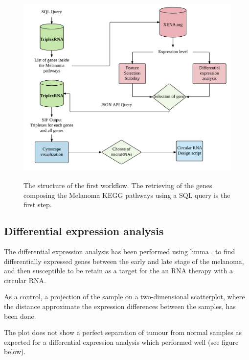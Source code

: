 \documentclass[a4paper,12pt]{report}
\begin{document}
\begin{figure}[H]
	\centering
	{\includegraphics[width=1\textwidth]{Workflow1.png}}
	\caption{The structure of the first workflow. The retrieving of the genes composing the Melanoma KEGG pathways using a SQL query is the first step.}
\end{figure}

\subsection{Differential expression analysis}

The differential expression analysis has been performed using limma \cite{limma}, to find differentially expressed genes between the early and late stage of the melanoma, and then susceptible to be retain as a target for the an RNA therapy with a circular RNA.

As a control, a projection of the sample on a two-dimensional scatterplot, where the distance approximate the expression differences between the samples, has been done.

The plot does not show a perfect separation of tumour from normal samples as expected for a differential expression analysis which performed well (see figure below).
\end{document}
